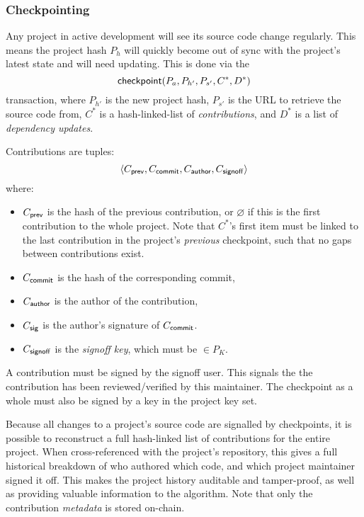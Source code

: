 \subsubsection{Checkpointing} \label{s:checkpointing} Any project in active
development will see its source code change regularly. This means the project
hash $P_h$ will quickly become out of sync with the project's latest state and
will need updating. This is done via the
\[
    \mathsf{checkpoint}\lparen P_a, P_{h'}, P_{s'}, C^*, D^*\rparen
\]
transaction, where $P_{h'}$ is the new project hash, $P_{s'}$ is the URL to
retrieve the source code from, $C^*$ is a hash-linked-list of
\emph{contributions}, and $D^*$ is a list of \emph{dependency updates}.

Contributions are tuples:
\[
   \langle C_{\mathsf{prev}}, C_{\mathsf{commit}}, C_{\mathsf{author}}, C_{\mathsf{signoff}}\rangle
\]
where:
\begin{itemize}
\item $C_{\mathsf{prev}}$ is the hash of the previous contribution, or
  $\varnothing$ if this is the first contribution to the whole
  project. Note that $C^*$'s first item must be linked to the last
  contribution in the project's \emph{previous} checkpoint, such that no
  gaps between contributions exist.
\item $C_{\mathsf{commit}}$ is the hash of the corresponding commit,
\item $C_{\mathsf{author}}$ is the author of the contribution,
\item $C_{\mathsf{sig}}$ is the author's signature of $C_{\mathsf{commit}}$.
\item $C_{\mathsf{signoff}}$ is the \emph{signoff key}, which must be $\in P_K$.
\end{itemize}
A contribution must be signed by the signoff user. This signals the
the contribution has been reviewed/verified by this maintainer. The
checkpoint as a whole must also be signed by a key in the project key set.

Because all changes to a project's source code are signalled by checkpoints, it
is possible to reconstruct a full hash-linked list of contributions for the
entire project. When cross-referenced with the project's repository, this gives
a full historical breakdown of who authored which code, and which project
maintainer signed it off.  This makes the project history auditable and
tamper-proof, as well as providing valuable information to the \osrank{}
algorithm. Note that only the contribution \emph{metadata} is stored on-chain.

